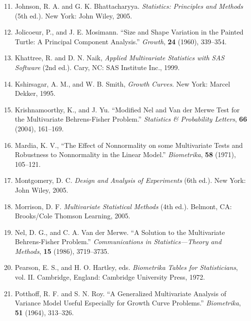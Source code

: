 
\begin{enumerate}
\setcounter{enumi}{10}
\item Johnson, R. A. and G. K. Bhattacharyya. \textit{Statistics: Principles and Methods} (5th ed.). New York: John Wiley, 2005.

\item Jolicoeur, P., and J. E. Mosimann. ``Size and Shape Variation in the Painted Turtle: A Principal Component Analysis.'' \textit{Growth}, \textbf{24} (1960), 339--354.

\item Khattree, R. and D. N. Naik, \textit{Applied Multivariate Statistics with SAS\textregistered{} Software} (2nd ed.). Cary, NC: SAS Institute Inc., 1999.

\item Kshirsagar, A. M., and W. B. Smith, \textit{Growth Curves}. New York: Marcel Dekker, 1995.

\item Krishnamoorthy, K., and J. Yu. ``Modified Nel and Van der Merwe Test for the Multivariate Behrens-Fisher Problem.'' \textit{Statistics \& Probability Letters}, \textbf{66} (2004), 161--169.

\item Mardia, K. V., ``The Effect of Nonnormality on some Multivariate Tests and Robustness to Nonnormality in the Linear Model.'' \textit{Biometrika}, \textbf{58} (1971), 105--121.

\item Montgomery, D. C. \textit{Design and Analysis of Experiments} (6th ed.). New York: John Wiley, 2005.

\item Morrison, D. F. \textit{Multivariate Statistical Methods} (4th ed.). Belmont, CA: Brooks/Cole Thomson Learning, 2005.

\item Nel, D. G., and C. A. Van der Merwe. ``A Solution to the Multivariate Behrens-Fisher Problem.'' \textit{Communications in Statistics---Theory and Methods}, \textbf{15} (1986), 3719--3735.

\item Pearson, E. S., and H. O. Hartley, eds. \textit{Biometrika Tables for Statisticians}, vol. II. Cambridge, England: Cambridge University Press, 1972.

\item Potthoff, R. F. and S. N. Roy. ``A Generalized Multivariate Analysis of Variance Model Useful Especially for Growth Curve Problems.'' \textit{Biometrika}, \textbf{51} (1964), 313--326.


\end{enumerate}
